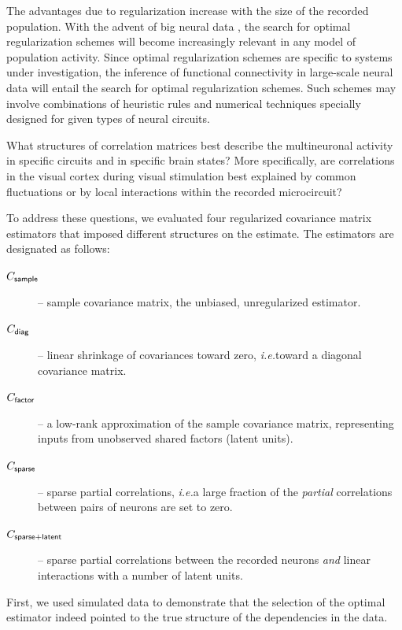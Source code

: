 \documentclass[10pt]{article}
\newcommand{\ie}{\emph{i.e.}\;}
\begin{document}
The advantages due to regularization increase with the size of the recorded population. With the advent of  big neural data \cite{Alivisatos:2013}, the search for optimal regularization schemes will become increasingly relevant in any model of population activity. Since optimal regularization schemes are specific to systems under investigation, the inference of functional connectivity in large-scale neural data will entail the search for optimal regularization schemes. Such schemes may involve combinations of heuristic rules and numerical techniques specially designed for given types of neural circuits.

What structures of correlation matrices best describe the multineuronal activity in specific circuits and in specific brain states?  More specifically, are correlations in the visual cortex during visual stimulation best explained by common fluctuations or by local interactions within the recorded microcircuit? 

To address these questions, we evaluated four regularized covariance matrix estimators that imposed different structures on the estimate. The estimators are designated as follows:
\begin{description}
\item[$C_{\sf sample}$] -- sample covariance matrix, the unbiased, unregularized estimator.
\item[$C_{\sf diag}$] -- linear shrinkage of covariances toward zero, \ie toward a diagonal covariance matrix.
\item[$C_{\sf factor}$] -- a low-rank approximation of the sample covariance matrix, representing inputs from unobserved shared factors (latent units).
\item[$C_{\sf sparse}$] -- sparse partial correlations, \ie a large fraction of the \emph{partial} correlations between pairs of neurons are set to zero.
\item[$C_{\sf sparse+latent}$] -- sparse partial correlations between the recorded neurons \emph{and} linear interactions with a number of latent units.
\end{description} 

First, we used simulated data to demonstrate that the selection of the optimal estimator indeed pointed to the true structure of the dependencies in the data. 
\end{document}
